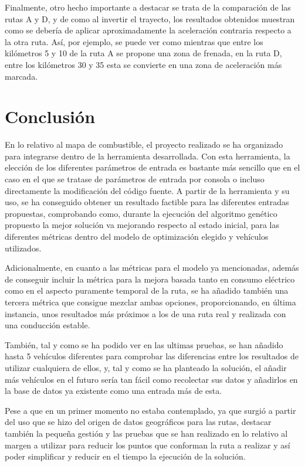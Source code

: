 \documentclass[11pt,spanish,listoffigures,listoftables]{tfgetsinf}
\begin{document}
Finalmente, otro hecho importante a destacar se trata de la comparación de las rutas A y D, y de como al invertir el trayecto, los resultados obtenidos muestran como se debería de aplicar aproximadamente la aceleración contraria respecto a la otra ruta. Así, por ejemplo, se puede ver como mientras que entre los kilómetros 5 y 10 de la ruta A se propone una zona de frenada, en la ruta D, entre los kilómetros 30 y 35 esta se convierte en una zona de aceleración más marcada.

\chapter{Conclusión}
En lo relativo al mapa de combustible, el proyecto realizado se ha organizado para integrarse dentro de la herramienta desarrollada. Con esta herramienta, la elección de los diferentes parámetros de entrada es bastante más sencillo que en el caso en el que se tratase de parámetros de entrada por consola o incluso directamente la modificación del código fuente. A partir de la herramienta y su uso, se ha conseguido obtener un resultado factible para las diferentes entradas propuestas, comprobando como, durante la ejecución del algoritmo genético propuesto la mejor solución va mejorando respecto al estado inicial, para las diferentes métricas dentro del modelo de optimización elegido y vehículos utilizados.

Adicionalmente, en cuanto a las métricas para el modelo ya mencionadas, además de conseguir incluir la métrica para la mejora basada tanto en consumo eléctrico como en el aspecto puramente temporal de la ruta, se ha añadido también una tercera métrica que consigue mezclar ambas opciones, proporcionando, en última instancia, unos resultados más próximos a los de una ruta real y realizada con una conducción estable.

También, tal y como se ha podido ver en las ultimas pruebas, se han añadido hasta 5 vehículos diferentes para comprobar las diferencias entre los resultados de utilizar cualquiera de ellos, y, tal y como se ha planteado la solución, el añadir más vehículos en el futuro sería tan fácil como recolectar sus datos y añadirlos en la base de datos ya existente como una entrada más de esta.

Pese a que en un primer momento no estaba contemplado, ya que surgió a partir del uso que se hizo del origen de datos geográficos para las rutas, destacar también la pequeña gestión y las pruebas que se han realizado en lo relativo al margen a utilizar para reducir los puntos que conforman la ruta a realizar y así poder simplificar y reducir en el tiempo la ejecución de la solución.
\end{document}

